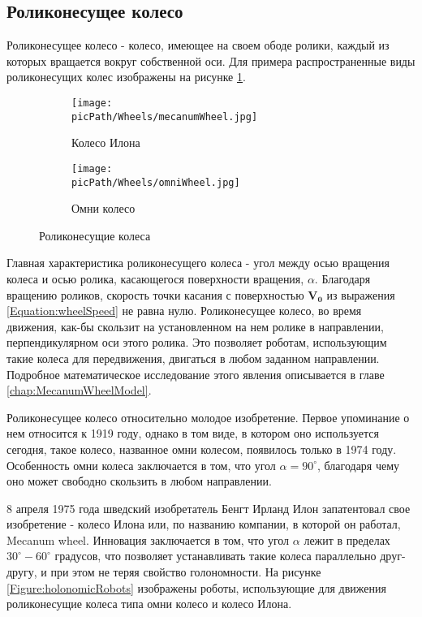 \documentclass[oneside,final,14pt]{extreport}
\newcommand{\picPath}{img}
\newcommand{\bs}{\boldsymbol}
\begin{document}
\subsection{Роликонесущее колесо}
Роликонесущее колесо - колесо, имеющее на своем ободе ролики, каждый из которых вращается вокруг собственной оси. Для примера распространенные виды роликонесущих колес изображены на рисунке \ref{Figure:rollerHandedWheels}.
\begin{figure}[H]
  \centering
  \begin{subfigure}[b]{0.4\linewidth}
   \texttt{[image: \\picPath/Wheels/mecanumWheel.jpg]}
    \caption{ Колесо Илона }
  \end{subfigure}
  \begin{subfigure}[b]{0.4\linewidth}
    \texttt{[image: \\picPath/Wheels/omniWheel.jpg]}
    \caption{ Омни колесо }
  \end{subfigure}
  \caption{ Роликонесущие колеса}
  \label{Figure:rollerHandedWheels}
\end{figure}

Главная характеристика роликонесущего колеса - угол между осью вращения колеса и  осью ролика, касающегося поверхности вращения, $\alpha$. Благодаря вращению роликов, скорость точки касания с поверхностью $\bs{V_{0}}$ из выражения \ref{Equation:wheelSpeed} не равна нулю. Роликонесущее колесо, во время движения, как-бы скользит на установленном на нем ролике в направлении, перпендикулярном оси этого ролика. Это позволяет роботам, использующим такие колеса для передвижения, двигаться в любом заданном направлении. Подробное математическое исследование этого явления описывается в главе \ref{chap:MecanumWheelModel}.

Роликонесущее колесо относительно молодое изобретение. Первое упоминание о нем относится к 1919 году\cite{OmniWheelPatent}, однако в том виде, в котором оно используется сегодня, такое колесо, названное омни колесом, появилось только в	1974 году\cite{OmniWheelPatentModern}. Особенность омни колеса заключается в том, что угол $\alpha = 90^{\circ}$, благодаря чему оно может свободно скользить в любом направлении.

8 апреля 1975 года шведский изобретатель Бенгт Ирланд Илон запатентовал свое изобретение - колесо Илона или, по названию компании, в которой он работал, Mecanum wheel\cite{MecanumWheelPatent}. Инновация заключается в том, что   угол $\alpha$  лежит в пределах $30^{\circ}-60^{\circ}$  градусов, что позволяет устанавливать такие колеса параллельно друг-другу, и при этом не теряя свойство голономности. На рисунке \ref{Figure:holonomicRobots} изображены роботы, использующие для движения роликонесущие колеса типа омни колесо и колесо Илона.
\end{document}
